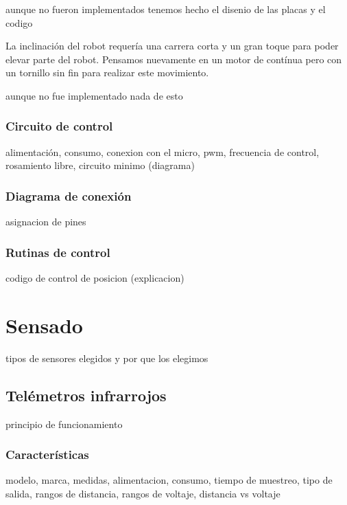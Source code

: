 aunque no fueron implementados tenemos hecho el disenio de las placas y el codigo

La inclinaci\'on del robot requer\'ia una carrera corta y un gran toque para poder elevar parte del robot.
Pensamos nuevamente en un motor de cont\'inua pero con un tornillo sin fin para realizar este movimiento.

aunque no fue implementado nada de esto


\subsubsection{Circuito de control}
\label{h_actuadores_servo_circuito}

alimentaci\'on, consumo, conexion con el micro, pwm, frecuencia de control, rosamiento libre, circuito minimo (diagrama)

\subsubsection{Diagrama de conexi\'on}
\label{h_actuadores_servo_diagrama}

asignacion de pines

\subsubsection{Rutinas de control}
\label{h_actuadores_servo_rutinas}

codigo de control de posicion (explicacion)

\section{Sensado}
\label{h_sensado}

tipos de sensores elegidos y por que los elegimos

\subsection{Tel\'emetros infrarrojos}
\label{h_sensado_telemetros}

principio de funcionamiento

\subsubsection{Caracter\'isticas}
\label{h_sensado_telemetros_caracteristicas}

modelo, marca, medidas, alimentacion, consumo, tiempo de muestreo, tipo de salida, rangos de distancia, rangos de voltaje, distancia vs voltaje

